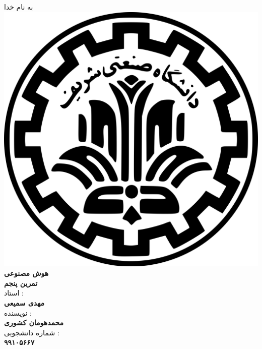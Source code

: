 \begin{center}
    به نام خدا
    \\
    \includegraphics[scale=0.02]{commons/sharif.png}
    \\
    \vspace*{5mm}
    \textbf{\Huge{هوش مصنوعی}}
    \hspace*{1mm}
    \vspace*{5mm}
    \\
    \vspace*{5mm}
    \textbf{تمرین پنجم}
    \\
    \vspace*{7mm}
    استاد :
    \\
    \vspace*{2mm}
    \textbf{\Large{مهدی سمیعی}}
    \\
    \vspace*{7mm}
    نویسنده :
    \\
    \vspace*{2mm}
    \textbf{\Large{محمدهومان کشوری}}
    \\
    \vspace*{7mm}
    شماره دانشجویی :
    \\
    \vspace*{2mm}
    \textbf{\Large{۹۹۱۰۵۶۶۷}}
\end{center}